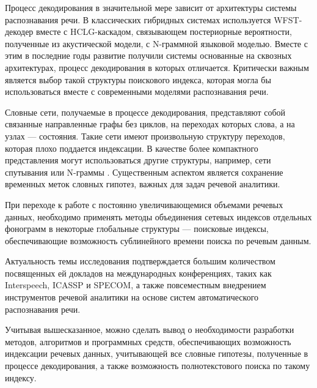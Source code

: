 Процесс декодирования в значительной мере зависит от архитектуры системы распознавания речи. В классических гибридных системах используется WFST-декодер вместе с HCLG-каскадом, связывающем постериорные вероятности, полученные из акустической модели, с N-граммной языковой моделью. Вместе с этим в последние годы развитие получили системы основанные на сквозных архитектурах, процесс декодирования в которых отличается. Критически важным является выбор такой структуры поискового индекса, которая могла бы использоваться вместе с современными моделями распознавания речи.

Словные сети, получаемые в процессе декодирования, представляют собой связанные направленные графы без циклов, на переходах которых слова, а на узлах --- состояния. Такие сети имеют произвольную структуру переходов, которая плохо поддается индексации. В качестве более компактного представления могут использоваться другие структуры, например, сети спутывания или N-граммы \cite{ConfNetConsensus,ManguConfNetIndex,Pan2007analytical}. Существенным аспектом является сохранение временных меток словных гипотез, важных для задач речевой аналитики.

При переходе к работе с постоянно увеличивающемися объемами речевых данных, необходимо применять методы объединения сетевых индексов отдельных фонограмм в некоторые глобальные структуры --- поисковые индексы, обеспечивающие возможность сублинейного времени поиска по речевым данным.

Актуальность темы исследования подтверждается большим количеством посвященных ей докладов на международных конференциях, таких как Interspeech, ICASSP и SPECOM, а также повсеместным внедрением инструментов речевой аналитики на основе систем автоматического распознавания речи.

Учитывая вышесказанное, можно сделать вывод о необходимости разработки методов, алгоритмов и программных средств, обеспечивающих возможность индексации речевых данных, учитывающей все словные гипотезы, полученные в процессе декодирования, а также возможность полнотекстового поиска по такому индексу.


